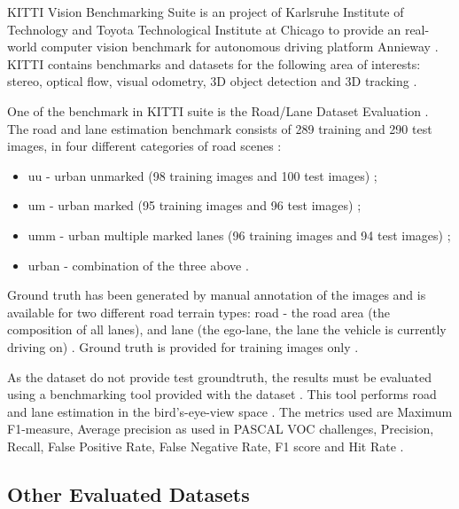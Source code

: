 \documentclass[10pt,twocolumn,letterpaper]{article}
\begin{document}
KITTI Vision Benchmarking Suite is an project of Karlsruhe Institute of Technology and Toyota Technological Institute at Chicago to provide an real-world computer vision benchmark for autonomous driving platform Annieway \cite{KITTI_FULL} \cite{KITTI_WEBSITE}. KITTI contains benchmarks and datasets for the following area of interests: stereo, optical flow, visual odometry, 3D object detection and 3D tracking \cite{KITTI_WEBSITE}.

One of the benchmark in KITTI suite is the Road/Lane Dataset Evaluation \cite{KITTI}. The road and lane estimation benchmark consists of 289 training and 290 test images, in four different categories of road scenes \cite{KITTI}:

\begin{itemize}
 \item uu - urban unmarked (98 training images and 100 test images) \cite{KITTI};
 \item um - urban marked (95 training images and 96 test images) \cite{KITTI};
 \item umm - urban multiple marked lanes (96 training images and 94 test images) \cite{KITTI};
 \item urban - combination of the three above \cite{KITTI}.
\end{itemize}

Ground truth has been generated by manual annotation of the images and is available for two different road terrain types: road - the road area (the composition of all lanes), and lane (the ego-lane, the lane the vehicle is currently driving on) \cite{KITTI} \cite{KITTI_WEBSITE}. Ground truth is provided for training images only \cite{KITTI}. 

As the dataset do not provide test groundtruth, the results must be evaluated using a benchmarking tool provided with the dataset \cite{KITTI_WEBSITE}. This tool  performs road and lane estimation in the bird's-eye-view space \cite{KITTI} \cite{KITTI_WEBSITE}. The metrics used are Maximum F1-measure, Average precision as used in PASCAL VOC challenges, Precision, Recall, False Positive Rate, False Negative Rate, F1 score and Hit Rate \cite{KITTI} \cite{KITTI_WEBSITE}.

\subsection{Other Evaluated Datasets} \label{ssec:other_datasets}
\end{document}
